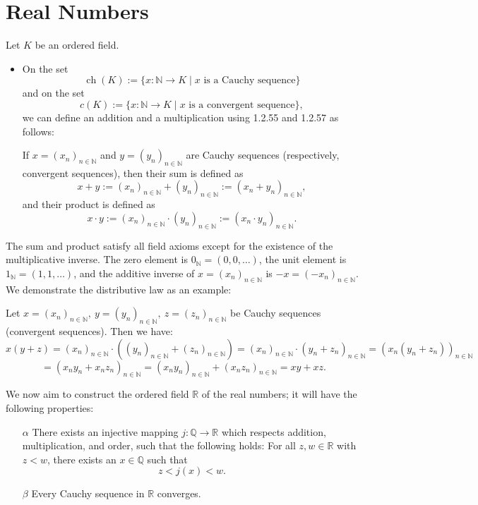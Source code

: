 \section{Real Numbers}

Let \( K \) be an ordered field.

\begin{itemize}[label=$-$]
	\item On the set
		\[
			\operatorname{ch}(K) := \{ x : \mathbb{N} \to K \mid x \text{ is a Cauchy sequence} \}
		\]
		and on the set
		\[
			c(K) := \{ x : \mathbb{N} \to K \mid x \text{ is a convergent sequence} \},
		\]
		we can define an addition and a multiplication using 1.2.55 and 1.2.57 as follows:

		If \( x = (x_n)_{n \in \mathbb{N}} \) and \( y = (y_n)_{n \in \mathbb{N}} \) are Cauchy sequences (respectively, convergent sequences), then their sum is defined as
		\[
			x + y := (x_n)_{n \in \mathbb{N}} + (y_n)_{n \in \mathbb{N}} := (x_n + y_n)_{n \in \mathbb{N}},
		\]
		and their product is defined as
		\[
			x \cdot y := (x_n)_{n \in \mathbb{N}} \cdot (y_n)_{n \in \mathbb{N}} := (x_n \cdot y_n)_{n \in \mathbb{N}}.
		\]
\end{itemize}

The sum and product satisfy all field axioms except for the existence of the multiplicative inverse.
The zero element is \( 0_{\mathbb{N}} = (0, 0, \ldots) \), the unit element is \( 1_{\mathbb{N}} = (1, 1, \ldots) \), and the additive inverse of \( x = (x_n)_{n \in \mathbb{N}} \) is \( -x = (-x_n)_{n \in \mathbb{N}} \).
We demonstrate the distributive law as an example:

Let \( x = (x_n)_{n \in \mathbb{N}},\ y = (y_n)_{n \in \mathbb{N}},\ z = (z_n)_{n \in \mathbb{N}} \) be Cauchy sequences (convergent sequences). Then we have:
\[
	x(y + z) = (x_n)_{n \in \mathbb{N}} \cdot \left( (y_n)_{n \in \mathbb{N}} + (z_n)_{n \in \mathbb{N}} \right)
	= (x_n)_{n \in \mathbb{N}} \cdot (y_n + z_n)_{n \in \mathbb{N}}
	= (x_n (y_n + z_n))_{n \in \mathbb{N}}
\]
\[
	= (x_n y_n + x_n z_n)_{n \in \mathbb{N}}
	= (x_n y_n)_{n \in \mathbb{N}} + (x_n z_n)_{n \in \mathbb{N}}
	= xy + xz.
\]

We now aim to construct the ordered field \( \mathbb{R} \) of the real numbers;
it will have the following properties:

\begin{itemize}[label=$-$]
	\item[\( \alpha\)] There exists an injective mapping \( j : \mathbb{Q} \to \mathbb{R} \) which respects addition, multiplication, and order, such that the following holds:
		For all \( z, w \in \mathbb{R} \) with \( z < w \), there exists an \( x \in \mathbb{Q} \) such that
		\[
			z < j(x) < w.
		\]

	\item[\( \beta\)] Every Cauchy sequence in \( \mathbb{R} \) converges.

\end{itemize}

